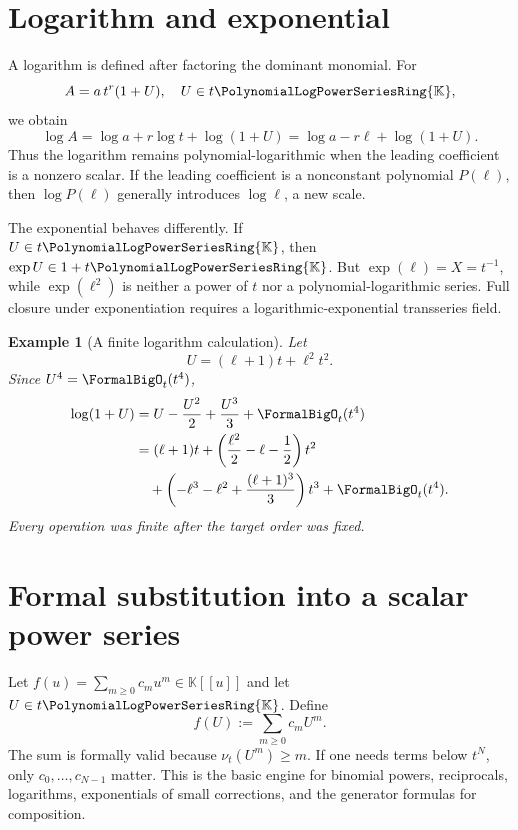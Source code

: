 \documentclass[11pt,oneside,openany]{book}
\newtheorem{example}[theorem]{Example}
\newcommand{\K}{\mathbb{K}}
\newcommand{\Rring}{\PolynomialLogPowerSeriesRing{\K}}
\newcommand{\ordt}{\nu_t}
\begin{document}
\section{Logarithm and exponential}
A logarithm is defined after factoring the dominant monomial.  For
\[
 A=a\,t^r(1+U),
 \quad U\in t\Rring,
\]
we obtain
\begin{equation}\label{eq:logfactor}
 \log A=\log a+r\log t+\log(1+U)
       =\log a-r\ell+\log(1+U).
\end{equation}
Thus the logarithm remains polynomial-logarithmic when the leading coefficient
is a nonzero scalar.  If the leading coefficient is a nonconstant polynomial
\(P(\ell)\), then \(\log P(\ell)\) generally introduces \(\log\ell\), a new
scale.

The exponential behaves differently.  If \(U\in t\Rring\), then \(\exp U\in
1+t\Rring\).  But \(\exp(\ell)=X=t^{-1}\), while \(\exp(\ell^2)\) is neither a
power of \(t\) nor a polynomial-logarithmic series.  Full closure under
exponentiation requires a logarithmic-exponential transseries field.

\begin{example}[A finite logarithm calculation]
Let
\[
 U=(\ell+1)t+\ell^2t^2.
\]
Since \(U^4=\FormalBigO_t(t^4)\),
\begin{align*}
 \log(1+U)
 & =U-\frac{U^2}{2}+\frac{U^3}{3}+\FormalBigO_t(t^4)\\
 & =(\ell+1)t
 +\left(\frac{\ell^2}{2}-\ell-\frac12\right)t^2\\
 &\quad+
 \left(-\ell^3-\ell^2+\frac{(\ell+1)^3}{3}\right)t^3
 +\FormalBigO_t(t^4).
\end{align*}
Every operation was finite after the target order was fixed.
\end{example}

\section{Formal substitution into a scalar power series}
Let \(f(u)=\sum_{m\geq0}c_mu^m\in\K[[u]]\) and let \(U\in t\Rring\).  Define
\begin{equation}\label{eq:scalarfunctional}
 f(U):=\sum_{m\geq0}c_mU^m.
\end{equation}
The sum is formally valid because \(\ordt(U^m)\geq m\).  If one needs terms
below \(t^N\), only \(c_0,\ldots,c_{N-1}\) matter.  This is the basic engine for
binomial powers, reciprocals, logarithms, exponentials of small corrections,
and the generator formulas for composition.
\end{document}

